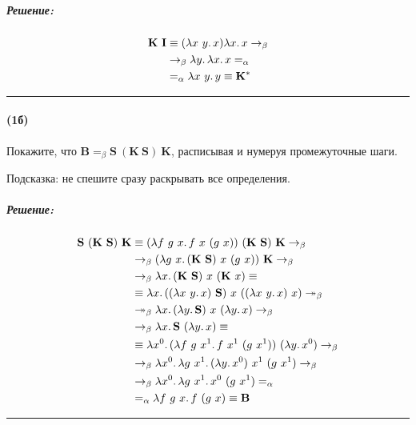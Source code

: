 \documentclass{article}
\newenvironment{proof}{\subparagraph{\hspace{-1em}Решение:\newline}\-}{\par\noindent\rule{\textwidth}{0.4pt}}
\newcommand{\comb}[1]{\mathbf{#1}}
\newcommand{\eqbeta}{=_\beta}
\newcommand{\betastep}{\rightarrow_\beta}
\newcommand{\betasteps}{\twoheadrightarrow_\beta}
\begin{document}
    \begin{proof}
        \begin{align}
            \comb{K}~\comb{I} & \equiv (\lambda x~y\ldotp x) \lambda x\ldotp x \betastep \\
                             & \betastep \lambda y\ldotp \lambda x\ldotp x =_\alpha \\
                             & =_\alpha \lambda x~y\ldotp y \equiv \comb{K}^*
        \end{align} 
    \end{proof}

    \paragraph{(1б)}

    Покажите, что $\comb{B} \eqbeta \comb{S}~(\comb{K}~\comb{S})~\comb{K}$, расписывая и нумеруя промежуточные шаги.

    Подсказка: не спешите сразу раскрывать все определения.

    \begin{proof}
        \begin{align}
            \comb{S}~(\comb{K}~\comb{S})~\comb{K} & \equiv (\lambda f~g~x\ldotp f~x~(g~x))~(\comb{K}~\comb{S})~\comb{K} \betastep \\
                             & \betastep (\lambda g~x\ldotp (\comb{K}~\comb{S})~x~(g~x))~\comb{K} \betastep \\
                             & \betastep \lambda x\ldotp (\comb{K}~\comb{S})~x~(\comb{K}~x) \equiv \\
                             & \equiv \lambda x\ldotp ((\lambda x~y\ldotp x)~\comb{S})~x~((\lambda x~y\ldotp x)~x) \betasteps \\
                             & \betasteps \lambda x\ldotp (\lambda y\ldotp \comb{S})~x~(\lambda y\ldotp x) \betastep \\
                             & \betastep \lambda x\ldotp \comb{S}~(\lambda y\ldotp x) \equiv \\
                             & \equiv \lambda x^0\ldotp (\lambda f~g~x^1\ldotp f~x^1~(g~x^1))~(\lambda y\ldotp x^0) \betastep \\
                             & \betastep \lambda x^0\ldotp \lambda g~x^1\ldotp (\lambda y\ldotp x^0)~x^1~(g~x^1) \betastep \\
                             & \betastep \lambda x^0\ldotp \lambda g~x^1\ldotp x^0~(g~x^1) =_\alpha \\
                             & =_\alpha \lambda f~g~x\ldotp f~(g~x) \equiv \comb{B}
        \end{align} 
    \end{proof}
\end{document}

